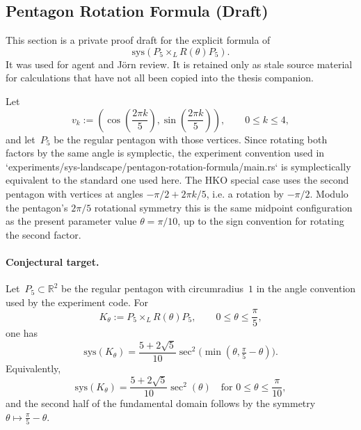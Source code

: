 %
%
%
%

\subsection{Pentagon Rotation Formula (Draft)}
\label{sec:pentagon-rotation-formula}

This section is a private proof draft for the explicit formula of
\[
  \mathrm{sys}\!\left(P_5 \times_L R(\theta) P_5\right).
\]
It was used for agent and Jörn review. It is retained only as stale source
material for calculations that have not all been copied into the thesis
companion.

Let
\[
  v_k := \left(
    \cos\left(\frac{2\pi k}{5}\right),
    \sin\left(\frac{2\pi k}{5}\right)
  \right),
  \qquad 0 \le k \le 4,
\]
and let~$P_5$ be the regular pentagon with those vertices. Since rotating both
factors by the same angle is symplectic, the experiment convention used in
`experiments/sys-landscape/pentagon-rotation-formula/main.rs` is symplectically
equivalent to the standard one used here. The HKO special case uses the second
pentagon with vertices at angles $-\pi/2 + 2\pi k/5$, i.e. a rotation by
$-\pi/2$. Modulo the pentagon's $2\pi/5$ rotational symmetry this is the same
midpoint configuration as the present parameter value $\theta=\pi/10$, up to
the sign convention for rotating the second factor.

\begin{unverified}
\paragraph{Conjectural target.}
Let~$P_5 \subset \mathbb{R}^2$ be the regular pentagon with circumradius~$1$
in the angle convention used by the experiment code. For
\[
  K_\theta := P_5 \times_L R(\theta) P_5,
  \qquad 0 \le \theta \le \frac{\pi}{5},
\]
one has
\[
  \mathrm{sys}(K_\theta)
  =
  \frac{5 + 2\sqrt{5}}{10}
  \sec^2\!\bigl(\min(\theta, \tfrac{\pi}{5} - \theta)\bigr).
\]
Equivalently,
\[
  \mathrm{sys}(K_\theta)
  =
  \frac{5 + 2\sqrt{5}}{10}\sec^2(\theta)
  \quad \text{for } 0 \le \theta \le \frac{\pi}{10},
\]
and the second half of the fundamental domain follows by the symmetry
$\theta \mapsto \frac{\pi}{5} - \theta$.
\end{unverified}


